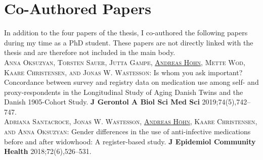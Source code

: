 
\chapter{Co-Authored Papers}

In addition to the four papers of the thesis, I co-authored the 
following papers during my time as a PhD student. These papers 
are not directly linked with the thesis and are therefore not 
included in the main body.\\

		\textsc{Anna Oksuzyan, Torsten Sauer, Jutta Gampe, \underline{Andreas H\"ohn}, Mette Wod, Kaare Christensen,
		and Jonas W. Wastesson:} 
		Is whom you ask important? Concordance between survey and registry data on medication 
		use among self- and proxy-respondents in the Longitudinal Study of Aging Danish Twins 
		and the Danish 1905-Cohort Study. \textbf{J Gerontol A Biol Sci Med Sci} 2019;74(5),742--747.
		\textit{} \\
		
		\textsc{Adriana Santacroce, Jonas W. Wastesson, \underline{Andreas H\"ohn}, Kaare Christensen, 
		and Anna Oksuzyan:} 
		Gender differences in the use of anti-infective medications before and after widowhood: 
		A register-based study. \textbf{J Epidemiol Community Health} 2018;72(6),526--531.
		\textit{}

